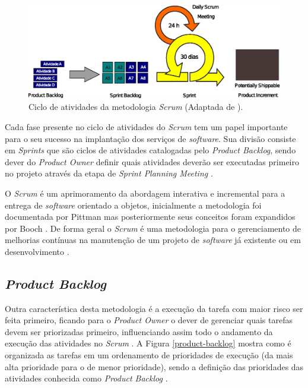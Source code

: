 \begin{figure}[!h]
  \centering
  \includegraphics[width=1\textwidth]{figuras/scrum_ciclo.eps} 
  \caption{Ciclo de atividades da metodologia \textit{Scrum} (Adaptada de \cite{pressmanengenharia}).}
  \label{fig-ciclo-scrum} 
\end{figure}

Cada fase presente no ciclo de atividades do \textit{Scrum} tem um papel importante para o seu sucesso na implantação dos serviços de \textit{software}. Sua divisão consiste em \textit{Sprints} que são ciclos de atividades catalogadas pelo \textit{Product Backlog}, sendo dever do \textit{Product Owner} definir quais atividades deverão ser executadas primeiro no projeto através da etapa de \textit{Sprint Planning Meeting} \cite{rubin2012essential}.

O \textit{Scrum} é um aprimoramento da abordagem interativa e incremental para a entrega de \textit{software} orientado a objetos, inicialmente a metodologia foi documentada por Pittman mas posteriormente seus conceitos foram expandidos por Booch \cite{schwaber1997scrum}. De forma geral o \textit{Scrum} é uma metodologia para o gerenciamento de melhorias contínuas na manutenção de um projeto de \textit{software} já existente ou em desenvolvimento \cite{schwaber1997scrum}.

\subsection*{\textit{Product Backlog}}

\noindent Outra característica desta metodologia é a execução da tarefa com maior risco ser feita primeiro, ficando para o \textit{Product Owner} o dever de gerenciar quais tarefas devem ser priorizadas primeiro, influenciando assim todo o andamento da execução das atividades no \textit{Scrum} \cite{rubin2012essential}. A Figura \ref{product-backlog} mostra como é organizada as tarefas em um ordenamento de prioridades de execução (da mais alta prioridade para o de menor prioridade), sendo a definição das prioridades das atividades conhecida como \textit{Product Backlog} \cite{rubin2012essential}.

